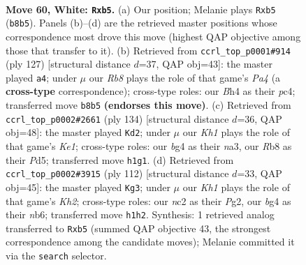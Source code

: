 \documentclass[11pt]{article}
\begin{document}
\clearpage

\begin{figure}[p]\centering
\begin{subfigure}{0.46\textwidth}\centering
\resizebox{\linewidth}{!}{%
\newchessgame
\chessboard[
  setfen={1R6/6k1/2r5/1p6/4r1bB/6R1/2n2P2/7K w - - 0 60},
  showmover=false,
  pgfstyle=straightmove, color=movearrow, markmove={b8-b5}
]}
\caption{}
\end{subfigure}\hfill
\begin{subfigure}{0.46\textwidth}\centering
\resizebox{\linewidth}{!}{%
\newchessgame
\chessboard[
  setfen={5R2/8/K7/p3kBp1/2P2r2/8/8/8 b - - 2 64},
  showmover=false,
  pgfstyle=straightmove, color=movearrow, markmove={a5-a4}
]}
\caption{}
\end{subfigure}
\\[4pt]
\begin{subfigure}{0.46\textwidth}\centering
\resizebox{\linewidth}{!}{%
\newchessgame
\chessboard[
  setfen={8/8/3p1k2/r2P4/8/nB6/R7/4K3 w - - 3 68},
  showmover=false,
  pgfstyle=straightmove, color=movearrow, markmove={e1-d2}
]}
\caption{}
\end{subfigure}\hfill
\begin{subfigure}{0.46\textwidth}\centering
\resizebox{\linewidth}{!}{%
\newchessgame
\chessboard[
  setfen={5k2/8/Rn1rp1p1/1P6/8/8/4B1PK/8 w - - 6 57},
  showmover=false,
  pgfstyle=straightmove, color=movearrow, markmove={h2-g3}
]}
\caption{}
\end{subfigure}
\caption{\textbf{Move 60, White: \texttt{Rxb5}.} (a) Our position; Melanie plays \texttt{Rxb5} (\texttt{b8b5}). Panels (b)--(d) are the retrieved master positions whose correspondence most drove this move (highest QAP objective among those that transfer to it). (b) Retrieved from \texttt{ccrl\_top\_p0001\#914} (ply 127) [structural distance $d$=37, QAP obj=43]: the master played \texttt{a4}; under $\mu$ our \emph{Rb8} plays the role of that game's \emph{Pa4} (a \textbf{cross-type} correspondence); cross-type roles: our \emph{B}h4 as their \emph{p}c4; transferred move \texttt{b8b5} \textbf{(endorses this move)}. (c) Retrieved from \texttt{ccrl\_top\_p0002\#2661} (ply 134) [structural distance $d$=36, QAP obj=48]: the master played \texttt{Kd2}; under $\mu$ our \emph{Kh1} plays the role of that game's \emph{Ke1}; cross-type roles: our \emph{b}g4 as their \emph{n}a3, our \emph{R}b8 as their \emph{P}d5; transferred move \texttt{h1g1}. (d) Retrieved from \texttt{ccrl\_top\_p0002\#3915} (ply 112) [structural distance $d$=33, QAP obj=45]: the master played \texttt{Kg3}; under $\mu$ our \emph{Kh1} plays the role of that game's \emph{Kh2}; cross-type roles: our \emph{n}c2 as their \emph{P}g2, our \emph{b}g4 as their \emph{n}b6; transferred move \texttt{h1h2}. Synthesis: 1 retrieved analog transferred to \texttt{Rxb5} (summed QAP objective 43, the strongest correspondence among the candidate moves); Melanie committed it via the \texttt{search} selector.}
\label{fig:thought-m118}
\end{figure}
\end{document}
